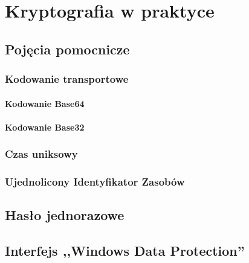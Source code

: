\chapter{Kryptografia w praktyce}

\section{Pojęcia pomocnicze}
\subsection{Kodowanie transportowe}
\subsubsection{Kodowanie Base64}
\subsubsection{Kodowanie Base32}
\subsection{Czas uniksowy}
\subsection{Ujednolicony Identyfikator Zasobów}

\section{Hasło jednorazowe}
\section{Interfejs ,,Windows Data Protection''}